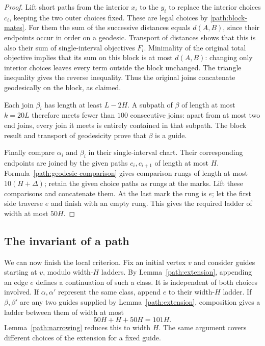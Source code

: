 \begin{proof}
Lift short paths from the interior $x_i$ to the $y_i$ to replace the
interior choices $c_i$, keeping the two outer choices fixed.  These are
legal choices by \eqref{path:block-mates}.  For them the sum of the
successive distances equals $d(A,B)$, since their endpoints occur in
order on a geodesic.  Transport of distances shows that this is also
their sum of single-interval objectives $F_i$.  Minimality of the
original total objective implies that its sum on this block is at most
$d(A,B)$: changing only interior choices leaves every term outside the
block unchanged.  The triangle inequality gives the reverse inequality.
Thus the original joins concatenate geodesically on the block, as
claimed.

Each join $\beta_i$ has length at least $L-2H$.  A subpath of $\beta$
of length at most $k=20L$ therefore meets fewer than $100$ consecutive
joins: apart from at most two end joins, every join it meets is entirely
contained in that subpath.  The block result and transport of
geodesicity prove that $\beta$ is a guide.

Finally compare $\alpha_i$ and $\beta_i$ in their single-interval
chart.  Their corresponding endpoints are joined by the given paths
$c_i,c_{i+1}$ of length at most $H$.  Formula~\eqref{path:geodesic-comparison}
gives comparison rungs of length at most $10(H+\Delta)$; retain the
given choice paths as rungs at the marks.  Lift these comparisons and
concatenate them.  At the last mark the rung is $e$; let the first
side traverse $e$ and finish with an empty rung.  This gives the required
ladder of width at most $50H$.
\end{proof}

\subsection{The invariant of a path}

We can now finish the local criterion.  Fix an initial vertex $v$ and
consider guides starting at $v$, modulo width-$H$ ladders.  By
Lemma~\ref{path:extension}, appending an edge $e$ defines a continuation
of such a class.  It is independent of both choices involved.  If
$\alpha,\alpha'$ represent the same class, append $e$ to their
width-$H$ ladder.  If $\beta,\beta'$ are any two guides supplied by
Lemma~\ref{path:extension}, composition gives a ladder between them of
width at most
\[
 50H+H+50H=101H.
\]
Lemma~\ref{path:narrowing} reduces this to width $H$.  The same argument
covers different choices of the extension for a fixed guide.

